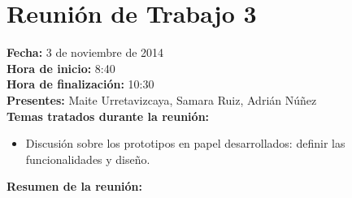\section*{Reunión de Trabajo 3}

\textbf{Fecha:} 3 de noviembre de 2014\\

\textbf{Hora de inicio:} 8:40\\

\textbf{Hora de finalización:} 10:30\\

\textbf{Presentes:} Maite Urretavizcaya, Samara Ruiz, Adrián Núñez\\

\textbf{Temas tratados durante la reunión:}

\begin{itemize}
\item Discusión sobre los prototipos en papel desarrollados: definir las funcionalidades y diseño.
\end{itemize}

\textbf{Resumen de la reunión:}

